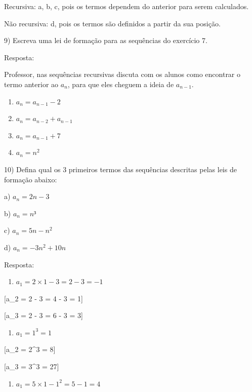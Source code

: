 Recursiva: a, b, c, pois os termos dependem do anterior para serem
calculados.

Não recursiva: d, pois os termos são definidos a partir da sua posição.

9) Escreva uma lei de formação para as sequências do exercício 7.

Resposta:

Professor, nas sequências recursivas discuta com os alunos como
encontrar o termo anterior ao \(a_{n}\), para que eles cheguem a ideia
de \(a_{n - 1}\).

\begin{enumerate}
\def\labelenumi{\alph{enumi})}
\item
  \(a_{n} = a_{n - 1} - 2\)
\item
  \(a_{n} = a_{n - 2} + a_{n - 1}\)
\item
  \(a_{n} = a_{n - 1} + 7\)
\item
  \(a_{n} = n^2\)
\end{enumerate}

10) Defina qual os 3 primeiros termos das sequências descritas pelas
leis de formação abaixo:

a) \(a_{n} = 2n - 3\)

b) \(a_{n} = n³\)

c) \(a_{n} = 5n - n^2\)

d) \(a_{n} = - 3n^{2} + 10n\)

Resposta:

\begin{enumerate}
\def\labelenumi{\alph{enumi})}
\tightlist
\item
  \(a_{1} = 2 \times 1 - 3 = 2 - 3 = - 1\)
\end{enumerate}

[\text{\ \ \ \ \ }a_{2} = 2  - 3 = 4 - 3 = 1]

[{\text{\ \ \ \ \ }a}_{3} = 2  - 3 = 6 - 3 = 3]

\begin{enumerate}
\def\labelenumi{\alph{enumi})}
\setcounter{enumi}{1}
\tightlist
\item
  \(a_{1} = 1^{3} = 1\)
\end{enumerate}

[\text{\ \ \ \ \ }a_{2} = 2^{3} = 8]

[{\text{\ \ \ \ \ }a}_{3} = 3^{3} = 27]

\begin{enumerate}
\def\labelenumi{\alph{enumi})}
\setcounter{enumi}{2}
\tightlist
\item
  \(a_{1} = 5 \times 1 - 1^{2} = 5 - 1 = 4\)
\end{enumerate}

